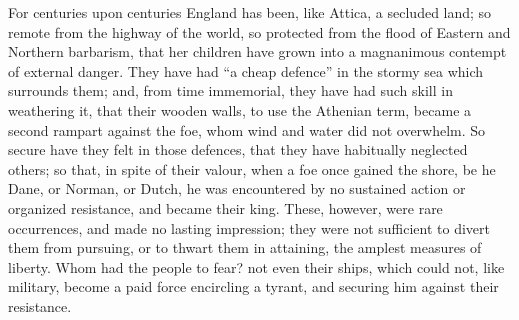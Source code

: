 For centuries upon centuries England has been,
like Attica, a secluded land; so remote from the highway of the world,
so protected from the flood of Eastern and Northern barbarism, that
her children have grown into a magnanimous contempt of external
danger. They have had ``a cheap defence'' in the stormy sea which
surrounds them; and, from time immemorial, they have had such skill in
weathering it, that their wooden walls, to use the Athenian term,
became a second rampart against the foe, whom wind and water did not
overwhelm. So secure have they felt in those defences, that they have
habitually neglected others; so that, in spite of their valour, when a
foe once gained the shore, be he Dane, or Norman, or Dutch, he was
encountered by no sustained action or organized resistance, and became
their king. These, however, were rare occurrences, and made no lasting
impression; they were not sufficient to divert them from pursuing, or
to thwart them in attaining, the amplest measures of liberty. Whom had
the people to fear? not even their ships, which could not, like
military, become a paid force encircling a tyrant, and securing him
against their resistance.

